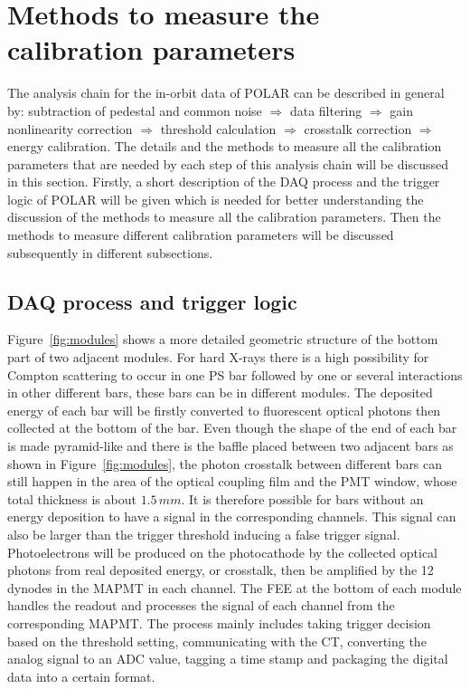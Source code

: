 \documentclass[preprint,sort&compress,12pt]{elsarticle}
\begin{document}
\newpage

\section{Methods to measure the calibration parameters}\label{sec:calib_pars}

The analysis chain for the in-orbit data of POLAR can be described in general by: subtraction of pedestal and common noise $\Rightarrow$ data filtering $\Rightarrow$ gain nonlinearity correction $\Rightarrow$ threshold calculation $\Rightarrow$ crosstalk correction $\Rightarrow$ energy calibration. The details and the methods to measure all the calibration parameters that are needed by each step of this analysis chain will be discussed in this section. Firstly, a short description of the DAQ process and the trigger logic of POLAR will be given which is needed for better understanding the discussion of the methods to measure all the calibration parameters. Then the methods to measure different calibration parameters will be discussed subsequently in different subsections.

\subsection{DAQ process and trigger logic}\label{sec:daq_process}

Figure~\ref{fig:modules} shows a more detailed geometric structure of the bottom part of two adjacent modules. For hard X-rays there is a high possibility for Compton scattering to occur in one PS bar followed by one or several interactions in other different bars, these bars can be in different modules. The deposited energy of each bar will be firstly converted to fluorescent optical photons then collected at the bottom of the bar. Even though the shape of the end of each bar is made pyramid-like and there is the baffle placed between two adjacent bars as shown in Figure~\ref{fig:modules}, the photon crosstalk between different bars can still happen in the area of the optical coupling film and the PMT window, whose total thickness is about $1.5\,mm$. It is therefore possible for bars without an energy deposition to have a signal in the corresponding channels. This signal can also be larger than the trigger threshold inducing a false trigger signal. Photoelectrons will be produced on the photocathode by the collected optical photons from real deposited energy, or crosstalk, then be amplified by the 12 dynodes in the MAPMT in each channel. The FEE at the bottom of each module handles the readout and processes the signal of each channel from the corresponding MAPMT. The process mainly includes taking trigger decision based on the threshold setting, communicating with the CT, converting the analog signal to an ADC value, tagging a time stamp and packaging the digital data into a certain format.
\end{document}
